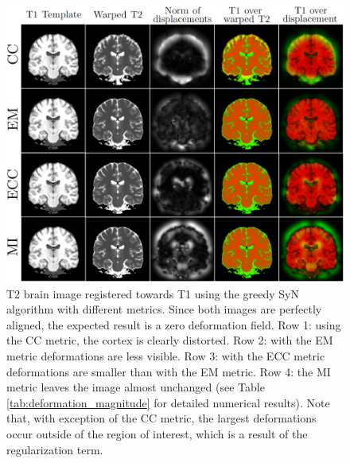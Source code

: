 \begin{figure}[H]
\centering
\includegraphics[width=1.0\linewidth]{./images/t1_t2_reg_pannel.png}
\caption{T2 brain image registered towards T1 using the greedy SyN algorithm with different metrics. Since both images are perfectly aligned, the expected result is a zero deformation field. Row 1: using the CC metric, the cortex is clearly distorted. Row 2: with the EM metric deformations are less visible. Row 3: with the ECC metric deformations are smaller than with the EM metric. Row 4: the MI metric leaves the image almost unchanged (see Table \ref{tab:deformation_magnitude} for detailed numerical results). Note that, with exception of the CC metric, the largest deformations occur outside of the region of interest, which is a result of the regularization term.}
\label{fig:t1_t2_reg_pannel}
\end{figure}

